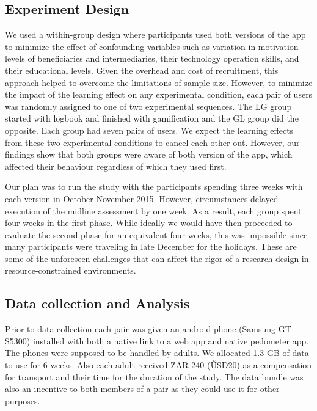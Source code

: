 \documentclass{sig-alternate}
\begin{document}
\subsection{Experiment Design}
We used a within-group design where participants used both versions of the app to minimize the effect of confounding variables such as variation in motivation levels of beneficiaries and intermediaries, their technology operation skills, and their educational levels. Given the overhead and cost of recruitment, this approach helped to overcome the limitations of sample size. However, to minimize the impact of the learning effect on any experimental condition, each pair of users was randomly assigned to one of two experimental sequences. The LG group started with logbook and finished with gamification and the GL group did the opposite. Each group had seven pairs of users. We expect the learning effects from these two experimental conditions to cancel each other out.  However, our findings show that both groups were aware of both version of the app, which affected their behaviour regardless of which they used first. 

Our plan was to run the study with the participants spending three weeks with each version in October-November 2015. However, circumstances delayed execution of the midline assessment by one week. As a result, each group spent four weeks in the first phase.  While ideally we would have then proceeded to evaluate the second phase for an equivalent four weeks, this was impossible since many participants were traveling in late December for the holidays. These are some of the unforeseen challenges that can affect the rigor of a research design in resource-constrained environments.  

\subsection{Data collection and Analysis} 
Prior to data collection each pair was given an android phone (Samsung
GT-S5300) installed with both a native link to a web app and native pedometer app. The phones were supposed to be handled by adults. We allocated 1.3 GB of data to use for 6 weeks. Also each adult received ZAR 240 (\~USD20) as a compensation for transport and their time for the duration of the study. The data bundle was also an incentive to both members of a pair as they could use it for other purposes. 
\end{document}
